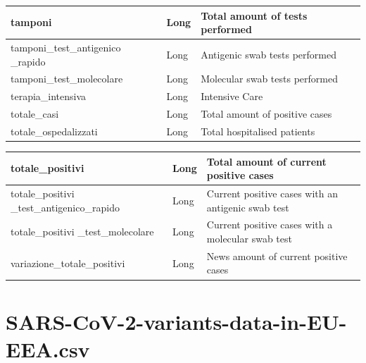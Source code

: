 \documentclass[a4paper,12pt]{article}
\begin{document}
\begin{center}
\begin{tabular}{|m{45mm}|>{\raggedright}m{16mm}|m{75mm}|}
\hline
tamponi & Long & Total amount of tests performed  \\
\hline
tamponi\_test\_antigenico \_rapido & Long & Antigenic swab tests performed \\
\hline
tamponi\_test\_molecolare & Long & Molecular swab tests performed \\
\hline
terapia\_intensiva & Long & Intensive Care \\
\hline
totale\_casi & Long & Total amount of positive cases \\
\hline
totale\_ospedalizzati & Long & Total hospitalised patients \\
\hline
\end{tabular}
\end{center}
\newpage
\begin{center}
\begin{tabular}{|m{45mm}|>{\raggedright}m{16mm}|m{75mm}|}
\hline
totale\_positivi & Long & Total amount of current positive cases \\
\hline
totale\_positivi  \_test\_antigenico\_rapido & Long & Current positive cases with an antigenic swab test \\
\hline
totale\_positivi  \_test\_molecolare & Long & Current positive cases with a molecular swab test \\
\hline
variazione\_totale\_positivi & Long & News amount of current positive cases \\
\hline
\end{tabular}
\end{center}
\newpage

\section{SARS-CoV-2-variants-data-in-EU-EEA.csv}
\end{document}
